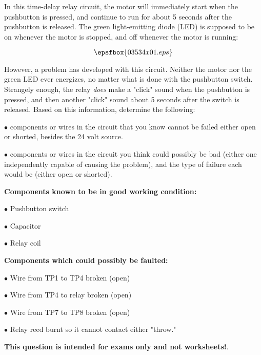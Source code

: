 

In this time-delay relay circuit, the motor will immediately start when the pushbutton is pressed, and continue to run for about 5 seconds after the pushbutton is released.  The green light-emitting diode (LED) is supposed to be on whenever the motor is stopped, and off whenever the motor is running:

$$\epsfbox{03534x01.eps}$$

However, a problem has developed with this circuit.  Neither the motor nor the green LED ever energizes, no matter what is done with the pushbutton switch.  Strangely enough, the relay {\it does} make a "click" sound when the pushbutton is pressed, and then another "click" sound about 5 seconds after the switch is released.  Based on this information, determine the following:

\vskip 10pt

\medskip
\item{$\bullet$}  components or wires in the circuit that you know cannot be failed either open or shorted, besides the 24 volt source.
\vskip 40pt
\item{$\bullet$}  components or wires in the circuit you think could possibly be bad (either one independently capable of causing the problem), and the type of failure each would be (either open or shorted).
\medskip







\goodbreak
\noindent
{\bf Components known to be in good working condition:}

\medskip
\item{$\bullet$} Pushbutton switch
\item{$\bullet$} Capacitor
\item{$\bullet$} Relay coil
\medskip

\vskip 10pt

\goodbreak
\noindent
{\bf Components which could possibly be faulted:}

\medskip
\item{$\bullet$} Wire from TP1 to TP4 broken (open)
\item{$\bullet$} Wire from TP4 to relay broken (open)
\item{$\bullet$} Wire from TP7 to TP8 broken (open)
\item{$\bullet$} Relay reed burnt so it cannot contact either "throw."
\medskip







{\bf This question is intended for exams only and not worksheets!}.



